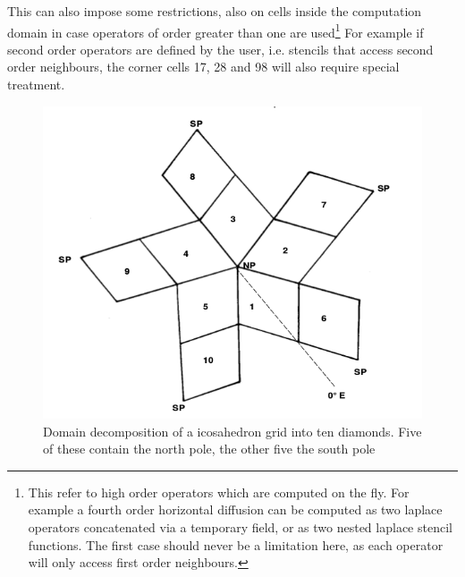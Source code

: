 \documentclass{book}
\begin{document}
This can also impose some restrictions, also on cells inside the computation domain in case operators of order greater than one are used\footnote{This refer to high order operators which are computed on the fly. 
For example a fourth order horizontal diffusion can be computed as 
two laplace operators concatenated via a temporary field, or as two nested
laplace stencil functions. The first case should never be a limitation here, as
each operator will only access first order neighbours.}
For example if second order operators are defined by the user, i.e. stencils
that access second order neighbours, the corner cells 17, 28 and 98 will 
also require special treatment. 

\begin{figure}[htb!]
	\begin{center}
		\includegraphics[width=14cm]{fig/IcosahedralDecomposition.png}
		\caption{Domain decomposition of a icosahedron grid into ten diamonds.
			Five of these contain the north pole, the other five the south pole}
		\label{fig:IcosahedralDecomposition}
	\end{center}
\end{figure}
\end{document}
